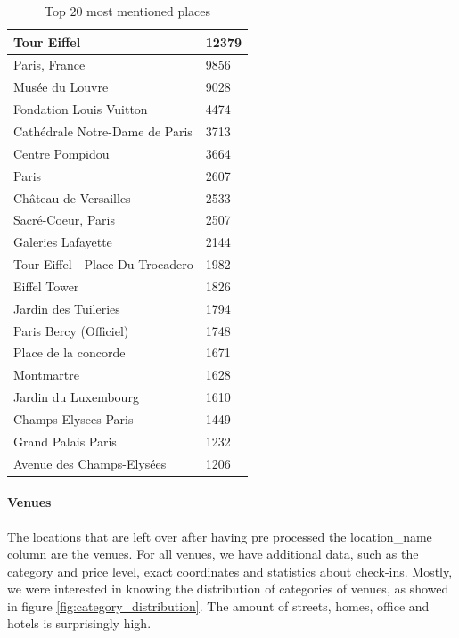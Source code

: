\begin{table}
  \centering
  \begin{tabu}{| l | l |}
  \hline
  Tour Eiffel & 12379 \\ \hline
  Paris, France & 9856 \\ \hline
  Musée du Louvre & 9028 \\ \hline
  Fondation Louis Vuitton & 4474 \\ \hline
  Cathédrale Notre-Dame de Paris & 3713 \\ \hline
  Centre Pompidou & 3664 \\ \hline
  Paris & 2607 \\ \hline
  Château de Versailles & 2533 \\ \hline
  Sacré-Coeur, Paris & 2507 \\ \hline
  Galeries Lafayette & 2144 \\ \hline
  Tour Eiffel - Place Du Trocadero & 1982 \\ \hline
  Eiffel Tower & 1826 \\ \hline
  Jardin des Tuileries & 1794 \\ \hline
  Paris Bercy (Officiel) & 1748 \\ \hline
  Place de la concorde & 1671 \\ \hline
  Montmartre & 1628 \\ \hline
  Jardin du Luxembourg & 1610 \\ \hline
  Champs Elysees Paris & 1449 \\ \hline
  Grand Palais Paris & 1232 \\ \hline
  Avenue des Champs-Elysées & 1206 \\ \hline
  \end{tabu}
  \caption{Top $20$ most mentioned places}
  \label{table:top_places}
\end{table}

\paragraph{Venues} The locations that are left over after having pre processed the location\_name column are the venues. For all venues, we have additional data, such as the category and price level, exact coordinates and statistics about check-ins. Mostly, we were interested in knowing the distribution of categories of venues, as showed in figure \ref{fig:category_distribution}. The amount of streets, homes, office and hotels is surprisingly high.

